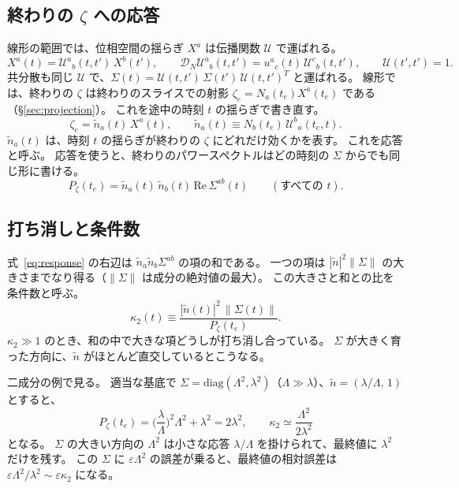 \documentclass[a4paper,11pt]{ltjsarticle}
\newcommand{\DN}{\mathcal{D}_N}
\begin{document}
\subsection{終わりの \texorpdfstring{$\zeta$}{ζ} への応答}

線形の範囲では、位相空間の揺らぎ $X^a$ は伝播関数 $\mathcal U$ で運ばれる。
\begin{equation}
X^a(t)=\mathcal U^a{}_b(t,t')\,X^b(t'),\qquad
\DN\mathcal U^a{}_b(t,t')=u^a{}_c(t)\,\mathcal U^c{}_b(t,t'),\qquad \mathcal U(t',t')=1 .
\end{equation}
共分散も同じ $\mathcal U$ で、$\Sigma(t)=\mathcal U(t,t')\,\Sigma(t')\,\mathcal U(t,t')^T$ と運ばれる。
線形では、終わりの $\zeta$ は終わりのスライスでの射影 $\zeta_e=N_a(t_e)X^a(t_e)$ である（\S\ref{sec:projection}）。
これを途中の時刻 $t$ の揺らぎで書き直す。
\begin{equation}
\zeta_e=\tilde n_a(t)\,X^a(t),\qquad \tilde n_a(t)\equiv N_b(t_e)\,\mathcal U^b{}_a(t_e,t) .
\end{equation}
$\tilde n_a(t)$ は、時刻 $t$ の揺らぎが終わりの $\zeta$ にどれだけ効くかを表す。
これを応答と呼ぶ。
応答を使うと、終わりのパワースペクトルはどの時刻の $\Sigma$ からでも同じ形に書ける。
\begin{equation}
P_\zeta(t_e)=\tilde n_a(t)\,\tilde n_b(t)\,\mathrm{Re}\,\Sigma^{ab}(t)\qquad(\text{すべての }t) .
\label{eq:response}
\end{equation}

\subsection{打ち消しと条件数}
\label{app:condition-number}

式~\eqref{eq:response} の右辺は $\tilde n_a\tilde n_b\Sigma^{ab}$ の項の和である。
一つの項は $|\tilde n|^2\|\Sigma\|$ の大きさまでなり得る（$\|\Sigma\|$ は成分の絶対値の最大）。
この大きさと和との比を条件数と呼ぶ。
\begin{equation}
\kappa_2(t)\equiv\frac{|\tilde n(t)|^2\,\|\Sigma(t)\|}{P_\zeta(t_e)} .
\end{equation}
$\kappa_2\gg1$ のとき、和の中で大きな項どうしが打ち消し合っている。
$\Sigma$ が大きく育った方向に、$\tilde n$ がほとんど直交しているとこうなる。

二成分の例で見る。
適当な基底で $\Sigma=\mathrm{diag}(\Lambda^2,\lambda^2)$（$\Lambda\gg\lambda$）、$\tilde n=(\lambda/\Lambda,\,1)$ とすると、
\[
P_\zeta(t_e)=\Big(\frac{\lambda}{\Lambda}\Big)^2\Lambda^2+\lambda^2=2\lambda^2,\qquad
\kappa_2\simeq\frac{\Lambda^2}{2\lambda^2}
\]
となる。
$\Sigma$ の大きい方向の $\Lambda^2$ は小さな応答 $\lambda/\Lambda$ を掛けられて、最終値に $\lambda^2$ だけを残す。
この $\Sigma$ に $\varepsilon\Lambda^2$ の誤差が乗ると、最終値の相対誤差は $\varepsilon\Lambda^2/\lambda^2\sim\varepsilon\kappa_2$ になる。
\end{document}
